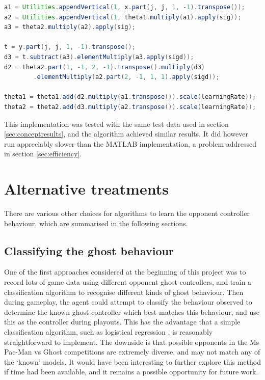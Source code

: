 \begin{lstlisting}[language=Java,label=lst:javanet,caption={Java neural network code},captionpos=b]
a1 = Utilities.appendVertical(1, x.part(j, j, 1, -1).transpose());
a2 = Utilities.appendVertical(1, theta1.multiply(a1).apply(sig));
a3 = theta2.multiply(a2).apply(sig);

t = y.part(j, j, 1, -1).transpose();
d3 = t.subtract(a3).elementMultiply(a3.apply(sigd));
d2 = theta2.part(1, -1, 2, -1).transpose().multiply(d3)
        .elementMultiply(a2.part(2, -1, 1, 1).apply(sigd));

theta1 = theta1.add(d2.multiply(a1.transpose()).scale(learningRate));
theta2 = theta2.add(d3.multiply(a2.transpose()).scale(learningRate));
\end{lstlisting}

This implementation was tested with the same test data used in section \ref{sec:conceptresults}, and the algorithm achieved similar results.  It did however run appreciably slower than the MATLAB implementation, a problem addressed in section \ref{sec:efficiency}.

\section{Alternative treatments}
\label{sec:alternativetreatments}

There are various other choices for algorithms to learn the opponent controller behaviour, which are summarised in the following sections.

\subsection{Classifying the ghost behaviour}

One of the first approaches considered at the beginning of this project was to record lots of game data using different opponent ghost controllers, and train a classification algorithm to recognise different kinds of ghost behaviour.  Then during gameplay, the agent could attempt to classify the behaviour observed to determine the known ghost controller which best matches this behaviour, and use this as the controller during playouts.  This has the advantage that a simple classification algorithm, such as logistical regression \citep[p. 725]{RussellNorvig}, is reasonably straightforward to implement.  The downside is that possible opponents in the Ms Pac-Man vs Ghost competitions are extremely diverse, and may not match any of the `known' models.  It would have been interesting to further explore this method if time had been available, and it remains a possible opportunity for future work.

